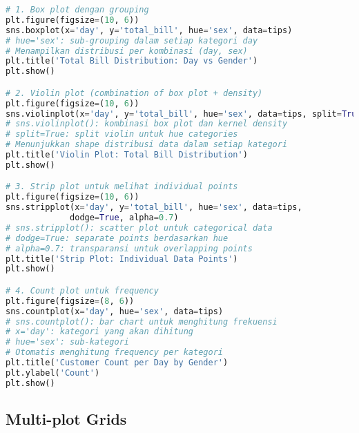 \begin{lstlisting}[language=python, caption={Box Plot, Violin Plot, dan Strip Plot}, style=python]
# 1. Box plot dengan grouping
plt.figure(figsize=(10, 6))
sns.boxplot(x='day', y='total_bill', hue='sex', data=tips)
# hue='sex': sub-grouping dalam setiap kategori day
# Menampilkan distribusi per kombinasi (day, sex)
plt.title('Total Bill Distribution: Day vs Gender')
plt.show()

# 2. Violin plot (combination of box plot + density)
plt.figure(figsize=(10, 6))
sns.violinplot(x='day', y='total_bill', hue='sex', data=tips, split=True)
# sns.violinplot(): kombinasi box plot dan kernel density
# split=True: split violin untuk hue categories
# Menunjukkan shape distribusi data dalam setiap kategori
plt.title('Violin Plot: Total Bill Distribution')
plt.show()

# 3. Strip plot untuk melihat individual points
plt.figure(figsize=(10, 6))
sns.stripplot(x='day', y='total_bill', hue='sex', data=tips,
             dodge=True, alpha=0.7)
# sns.stripplot(): scatter plot untuk categorical data
# dodge=True: separate points berdasarkan hue
# alpha=0.7: transparansi untuk overlapping points
plt.title('Strip Plot: Individual Data Points')
plt.show()

# 4. Count plot untuk frequency
plt.figure(figsize=(8, 6))
sns.countplot(x='day', hue='sex', data=tips)
# sns.countplot(): bar chart untuk menghitung frekuensi
# x='day': kategori yang akan dihitung
# hue='sex': sub-kategori
# Otomatis menghitung frequency per kategori
plt.title('Customer Count per Day by Gender')
plt.ylabel('Count')
plt.show()
\end{lstlisting}

\subsection*{Multi-plot Grids}

